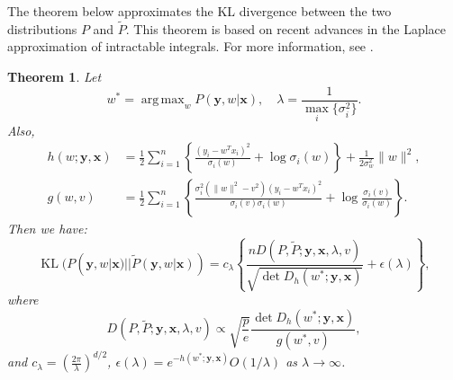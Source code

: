 \documentclass[12pt]{article}
\newtheorem{theorem}{Theorem}[section]
\DeclareMathOperator*{\argmax}{arg\,max}
\DeclareMathOperator{\KL}{KL}
\DeclareMathOperator{\det}{det}
\begin{document}
	The theorem below approximates the KL divergence between the two distributions $P$ and $\tilde{P}$. This theorem is based on recent advances in the Laplace approximation of intractable integrals. For more information, see \cite{shun1995approximate, tierney1986accurate, wong2001laplace}.
	
	\begin{theorem}
		Let
		\begin{equation}
			w^* = \argmax_w P(\mathbf{y}, w|\mathbf{x}), \quad \lambda = \frac{1}{\max_i\{\sigma_i^2\}}.
		\end{equation}
		Also,
		\begin{align}
			h(w; \mathbf{y}, \mathbf{x}) &= \frac{1}{2} \sum_{i=1}^{n} \left\{ \frac{(y_i - w^T x_i)^2}{\sigma_i(w)} + \log \sigma_i(w) \right\} + \frac{1}{2\sigma_w^2} \|w\|^2, \\
			g(w, v) &= \frac{1}{2} \sum_{i=1}^{n} \left\{ \frac{\sigma_i^2(\|w\|^2 - v^2)(y_i - w^T x_i)^2}{\sigma_i(v) \sigma_i(w)} + \log \frac{\sigma_i(v)}{\sigma_i(w)} \right\}.
		\end{align}
		Then we have:
		\begin{equation}
			\KL(P(\mathbf{y}, w|\mathbf{x}) || \tilde{P}(\mathbf{y}, w|\mathbf{x})) = c_\lambda \left\{ \frac{n D(P, \tilde{P}; \mathbf{y}, \mathbf{x}, \lambda, v)}{\sqrt{\det D_h(w^*; \mathbf{y}, \mathbf{x})}} + \epsilon(\lambda) \right\},
		\end{equation}
		where
		\begin{equation}
			D(P, \tilde{P}; \mathbf{y}, \mathbf{x}, \lambda, v) \propto \sqrt{\frac{p}{e}} \frac{\det D_h(w^*; \mathbf{y}, \mathbf{x})}{g(w^*, v)},
		\end{equation}
		and $c_\lambda = \left( \frac{2\pi}{\lambda} \right)^{d/2}$, $\epsilon(\lambda) = e^{-h(w^*; \mathbf{y}, \mathbf{x})} O(1/\lambda)$ as $\lambda \to \infty$.
	\end{theorem}
	
\end{document}
